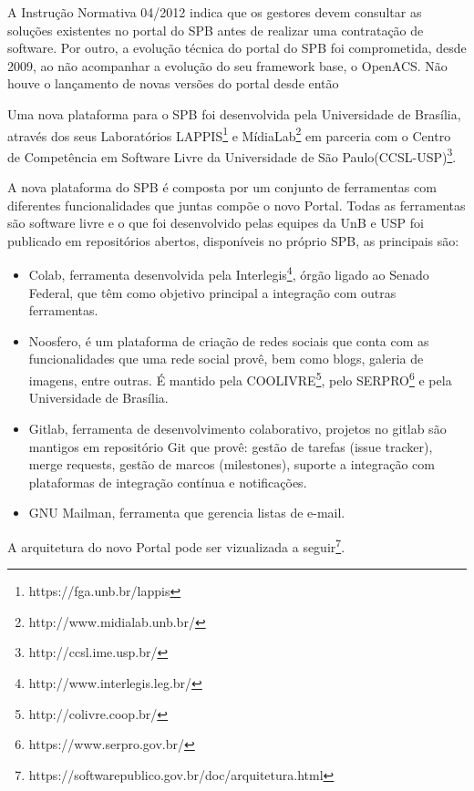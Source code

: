 A Instrução Normativa 04/2012 indica que os gestores devem consultar as soluções 
existentes no portal do SPB antes de realizar uma contratação de software. Por outro,
a evolução técnica do portal do SPB foi comprometida, desde 2009, ao não acompanhar 
a evolução do seu framework base, o OpenACS. Não houve o lançamento de novas versões do
portal desde então\cite{softwarepublico}

Uma nova plataforma para o SPB foi desenvolvida
pela Universidade de Brasília, através dos seus Laboratórios LAPPIS\footnote{https://fga.unb.br/lappis} 
e MídiaLab\footnote{http://www.midialab.unb.br/} 
em parceria com o Centro de Competência em Software Livre da Universidade de São Paulo(CCSL-USP)\footnote{http://ccsl.ime.usp.br/}.

A nova plataforma do SPB é composta por um conjunto de ferramentas com diferentes funcionalidades
que juntas compõe o novo Portal. Todas as ferramentas são software livre e o que foi desenvolvido pelas equipes da UnB e 
USP foi publicado em repositórios abertos, disponíveis no próprio SPB, as principais são:
\begin{itemize}

\item Colab, ferramenta desenvolvida pela Interlegis\footnote{http://www.interlegis.leg.br/}, órgão ligado 
ao Senado Federal, que têm como objetivo principal a integração com outras ferramentas.

\item Noosfero, é um plataforma de criação de redes sociais que conta com as funcionalidades
que uma rede social provê, bem como blogs, galeria de imagens, entre outras. É mantido pela 
COOLIVRE\footnote{http://colivre.coop.br/}, pelo SERPRO\footnote{https://www.serpro.gov.br/} e pela
Universidade de Brasília.

\item Gitlab, ferramenta de desenvolvimento colaborativo, projetos no gitlab são mantigos em 
repositório Git que provê: gestão de tarefas (issue tracker), merge requests, 
gestão de marcos (milestones), suporte a integração com plataformas de integração contínua e notificações.

\item GNU Mailman, ferramenta que gerencia listas de e-mail.

\end{itemize}

A arquitetura do novo Portal pode ser vizualizada a seguir\footnote{https://softwarepublico.gov.br/doc/arquitetura.html}.

